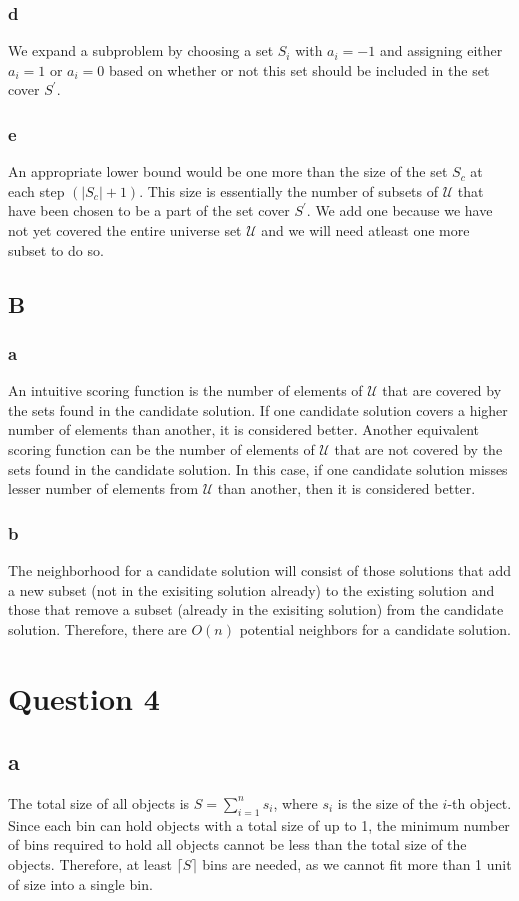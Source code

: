 \documentclass{article}
\begin{document}
\subsubsection{d}
We expand a subproblem by choosing a set $S_i$ with $a_i=-1$ and assigning either $a_i=1$ or $a_i=0$ based on whether or not this set should be included in the set cover $S^{\prime}$.
\subsubsection{e}
An appropriate lower bound would be one more than the size of the set $S_c$ at each step $\left(\left|S_c\right|+1\right)$. This size is essentially the number of subsets of $\mathcal{U}$ that have been chosen to be a part of the set cover $S^{\prime}$. We add one because we have not yet covered the entire universe set $\mathcal{U}$ and we will need atleast one more subset to do so.
\subsection{B}
\subsubsection{a}
An intuitive scoring function is the number of elements of $\mathcal{U}$ that are covered by the sets found in the candidate solution. If one candidate solution covers a higher number of elements than another, it is considered better. Another equivalent scoring function can be the number of elements of $\mathcal{U}$ that are not covered by the sets found in the candidate solution. In this case, if one candidate solution misses lesser number of elements from $\mathcal{U}$ than another, then it is considered better.
\subsubsection{b}
The neighborhood for a candidate solution will consist of those solutions that add a new subset (not in the exisiting solution already) to the existing solution and those that remove a subset (already in the exisiting solution) from the candidate solution. Therefore, there are $O(n)$ potential neighbors for a candidate solution.
\section{Question 4}
\subsection{a}
The total size of all objects is $S = \sum_{i=1}^{n} s_i$, where $s_i$ is the size of the $i$-th object. Since each bin can hold objects with a total size of up to 1, the minimum number of bins required to hold all objects cannot be less than the total size of the objects. Therefore, at least $\lceil S \rceil$ bins are needed, as we cannot fit more than 1 unit of size into a single bin.
\end{document}
